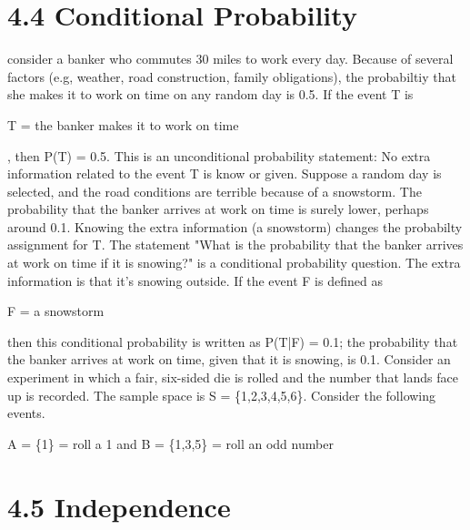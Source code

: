 \documentclass{report}
\begin{document}
\section*{4.4 Conditional Probability}
\bigbreak \noindent
consider a banker who commutes 30 miles to work every day. Because of several factors (e.g, weather, road construction, family obligations), the probabiltiy that she makes it to work on time on any random day is 0.5. If the event T is
\bigbreak \noindent
\centerline{T = the banker makes it to work on time},
\bigbreak \noindent
then P(T) = 0.5. This is an unconditional probability statement: No extra information related to the event T is know or given.
\bigbreak \noindent
Suppose a random day is selected, and the road conditions are terrible because of a snowstorm. The probability that the banker arrives at work on time is surely lower, perhaps around 0.1. Knowing the extra information (a snowstorm) changes the probabilty assignment for T.
\bigbreak \noindent
The statement "What is the probability that the banker arrives at work on time if it is snowing?" is a conditional probability question. The extra information is that it's snowing outside. If the event F is defined as
\bigbreak \noindent
\centerline{F = a snowstorm}
\bigbreak \noindent
then this conditional probability is written as P(T|F) = 0.1; the probability that the banker arrives at work on time, given that it is snowing, is 0.1.
\bigbreak \noindent \bigbreak \noindent
Consider an experiment in which a fair, six-sided die is rolled and the number that lands face up is recorded. The sample space is S = \{1,2,3,4,5,6\}. Consider the following events.
\bigbreak\noindent
\centerline{A = \{1\}  = roll a 1 \hspace{5mm} and B = \{1,3,5\} = roll an odd number}
\bigbreak \noindent
\pagebreak
\section*{4.5 Independence}
\end{document}
